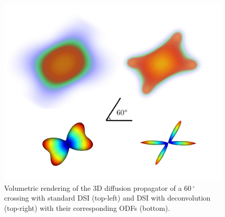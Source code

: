 \documentclass{bioinfo}
\begin{document}
\begin{figure}
\includegraphics[scale=0.60]{Figures/pdf_odf_60.jpg}
\centering{}
\caption{Volumetric rendering of the 3D diffusion propagator of a $60\,^{\circ}$ crossing with standard DSI (top-left) and DSI with deconvolution (top-right) with their corresponding ODFs (bottom).\label{Fig:pdf}}
\end{figure}
\end{document}
